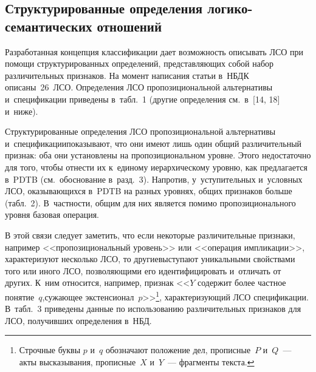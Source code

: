\begin{multicols}{2}
\section{Структурированные определения логико-семантических отношений}

  Разработанная концепция классификации дает воз\-мож\-ность описывать ЛСО 
при помощи структурированных определений, пред\-став\-ля\-ющих собой набор 
раз\-ли\-чи\-тель\-ных признаков. На момент на\-писания \mbox{статьи} в~НБДК 
описаны~26~ЛСО. Определения ЛСО пропозициональной альтернативы 
и~спецификации приведены в~табл.~1 (другие определения см.\ в~[14, 18] 
и~ниже).
  
  
  Структурированные определения ЛСО пропозициональной альтернативы 
и~спецификации\linebreak показывают, что они имеют лишь один общий 
различительный признак: оба они уста\-нов\-ле\-ны на пропозициональном уров\-не. 
Этого недостаточно для того, чтобы отнести их к~единому иерархическому 
уров\-ню, как предлагается в~PDTB (см.\ обоснование в~разд.~3). Напротив, 
у~уступительных и~условных ЛСО, ока\-зы\-ва\-ющих\-ся в~PDTB на раз\-ных уров\-нях, 
общих признаков больше (табл.~2). В~част\-ности, общим для них является помимо 
пропозиционального уров\-ня базовая операция.
  
  
 В этой связи следует заметить, что если некоторые различительные при\-зна\-ки, 
например <<пропозициональный уровень>> или <<операция импликации>>, 
характеризуют несколько ЛСО, то другие\linebreak высту\-па\-ют уникальными свойствами 
того или иного ЛСО, поз\-во\-ля\-ющи\-ми его идентифицировать и~отличать от 
других. К~ним относится, например, при\-знак <<$Y$ содержит более част\-ное 
понятие~$q$,\linebreak су\-жа\-ющее экстенсионал~$p$>>\footnote{Строчные буквы $p$ и~$q$ 
обозначают положение дел, прописные~$P$ и~$Q$~--- акты высказывания, прописные~$X$ 
и~$Y$~--- фрагменты текста.}, ха\-рак\-те\-ри\-зу\-ющий ЛСО 
спецификации. В~табл.~3 
приведены данные по использованию различительных при\-зна\-ков для ЛСО, 
получивших определения в~НБД. 

\end{multicols}


